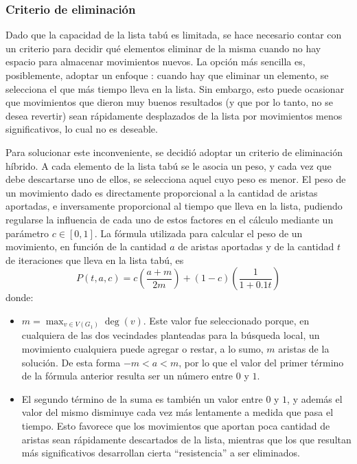 \subsubsection{Criterio de eliminación}
Dado que la capacidad de la lista tabú es limitada, se hace necesario contar
con un criterio para decidir qué elementos eliminar de la misma cuando no hay
espacio para almacenar movimientos nuevos. La opción más sencilla es,
posiblemente, adoptar un enfoque : cuando hay que eliminar un
elemento, se selecciona el que más tiempo lleva en la lista. Sin embargo, esto
puede ocasionar que movimientos que dieron muy buenos resultados (y que por
lo tanto, no se desea revertir) sean rápidamente desplazados de la lista por
movimientos menos significativos, lo cual no es deseable.

Para solucionar este inconveniente, se decidió adoptar un criterio de
eliminación híbrido. A cada elemento de la lista tabú se le asocia un peso, y
cada vez que debe descartarse uno de ellos, se selecciona aquel cuyo peso es
menor. El peso de un movimiento dado es directamente proporcional a la
cantidad de aristas aportadas, e inversamente proporcional al tiempo que lleva
en la lista, pudiendo regularse la influencia de cada uno de estos factores en
el cálculo mediante un parámetro $c \in [0,1]$. La fórmula utilizada para
calcular el peso de un movimiento, en función de la cantidad $a$ de aristas
aportadas y de la cantidad $t$ de iteraciones que lleva en la lista tabú, es
\[ P(t,a,c) = c \left( \frac{a + m} {2 m} \right) + (1-c) \left(\frac{1}{1+0.1t} \right) \]
donde:
\begin{itemize}
    \item $m = \max_{v \in V(G_1)} \deg(v)$. Este valor fue seleccionado
    porque, en cualquiera de las dos vecindades planteadas para la búsqueda
    local, un movimiento cualquiera puede agregar o restar, a lo sumo, $m$
    aristas de la solución. De esta forma $-m < a < m$, por lo que el valor
    del primer término de la fórmula anterior resulta ser un número entre $0$
    y $1$.
    \item El segundo término de la suma es también un valor entre $0$ y $1$, y
    además el valor del mismo disminuye cada vez más lentamente a medida que
    pasa el tiempo. Esto favorece que los movimientos que aportan poca
    cantidad de aristas sean rápidamente descartados de la lista, mientras que
    los que resultan más significativos desarrollan cierta ``resistencia'' a
    ser eliminados.
\end{itemize}

